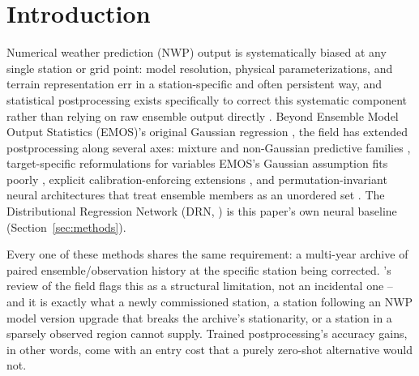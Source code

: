 \section{Introduction}
\label{sec:intro}

Numerical weather prediction (NWP) output is systematically biased at any
single station or grid point: model resolution, physical
parameterizations, and terrain representation err in a station-specific
and often persistent way, and statistical postprocessing exists
specifically to correct this systematic component rather than relying on
raw ensemble output directly \citep{vannitsem_2020_postprocessing_review,gneiting_2005_emos}.
Beyond Ensemble Model Output Statistics (EMOS)'s original Gaussian
regression \citep{gneiting_2005_emos}, the field has extended
postprocessing along several axes: mixture and non-Gaussian predictive
families \citep{baran_2015_mixture_emos}, target-specific reformulations
for variables EMOS's Gaussian assumption fits poorly
\citep{scheuerer_2013_precip_emos}, explicit calibration-enforcing
extensions \citep{wilks_2018_enforcing_calibration}, and
permutation-invariant neural architectures that treat ensemble members as
an unordered set \citep{hoehlein_2023_permutation_invariant}. The
Distributional Regression Network (DRN, \citealp{rasp_2018_drn}) is this
paper's own neural baseline (Section~\ref{sec:methods}).

Every one of these methods shares the same requirement: a multi-year
archive of paired ensemble/observation history at the specific station
being corrected. \citet{vannitsem_2020_postprocessing_review}'s review of
the field flags this as a structural limitation, not an incidental one --
and it is exactly what a newly commissioned station, a station following
an NWP model version upgrade that breaks the archive's stationarity, or a
station in a sparsely observed region cannot supply. Trained
postprocessing's accuracy gains, in other words, come with an entry cost
that a purely zero-shot alternative would not.

